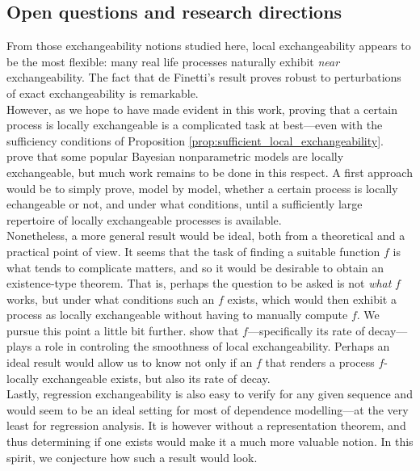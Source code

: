 \subsection{Open questions and research directions}


From those exchangeability notions studied here, local exchangeability appears to be the most flexible: many real life processes naturally exhibit \textit{near} exchangeability. The fact that de Finetti's result proves robust to perturbations of exact exchangeability is remarkable. 
\\


However, as we hope to have made evident in this work, proving that a certain process is locally exchangeable is a complicated task at best---even with the sufficiency conditions of Proposition \ref{prop:sufficient_local_exchangeability}. \cite{CampbellEtAl:2019:LocalExch} prove that some popular Bayesian nonparametric models are locally exchangeable, but much work remains to be done in this respect. A first approach would be to simply prove, model by model, whether a certain process is locally echangeable or not, and under what conditions, until a sufficiently large repertoire of locally exchangeable processes is available. 
\\

Nonetheless, a more general result would be ideal, both from a theoretical and a practical point of view. It seems that the task of finding a suitable function $f$ is what tends to complicate matters, and so it would be desirable to obtain an existence-type theorem. That is, perhaps the question to be asked is not \textit{what} $f$ works, but under what conditions such an $f$ exists, which would then exhibit a process as locally exchangeable without having to manually compute $f$. We pursue this point a little bit further. \cite{CampbellEtAl:2019:LocalExch} show that $f$---specifically its rate of decay---plays a role in controling the smoothness of local exchangeability. Perhaps an ideal result would allow us to know not only if an $f$ that renders a process $f$-locally exchangeable exists, but also its rate of decay.
\\


Lastly, regression exchangeability is also easy to verify for any given sequence and would seem to be an ideal setting for most of dependence modelling---at the very least for regression analysis. It is however without a representation theorem, and thus determining if one exists would make it a much more valuable notion. In this spirit, we conjecture how such a result would look.
\\


